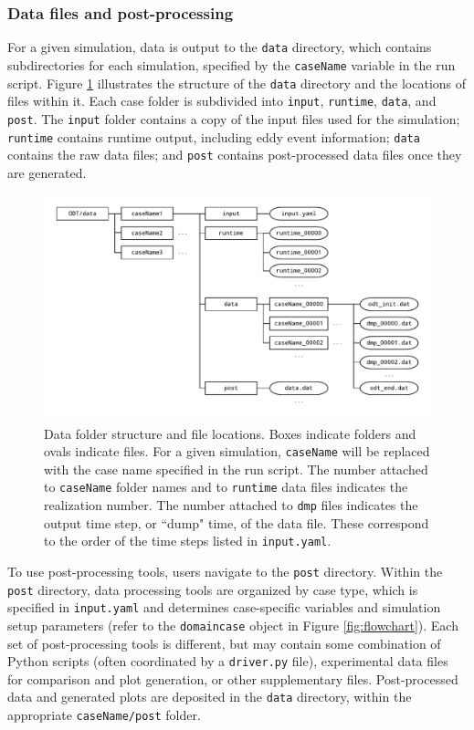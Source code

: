 \documentclass[preprint,12pt, a4paper]{elsarticle}
\begin{document}
\subsubsection{Data files and post-processing}

For a given simulation, data is output to the \texttt{data} directory, which contains subdirectories for each simulation, specified by the \texttt{caseName} variable in the run script. Figure \ref{fig:data_folder_structure} illustrates the structure of the \texttt{data} directory and the locations of files within it. Each case folder is subdivided into \texttt{input}, \texttt{runtime}, \texttt{data}, and \texttt{post}. The \texttt{input} folder contains a copy of the input files used for the simulation; \texttt{runtime} contains runtime output, including eddy event information; \texttt{data} contains the raw data files; and \texttt{post} contains post-processed data files once they are generated. 

\begin{figure}
	\centering
	\includegraphics[width=\textwidth]{../figures/data_folder_structure.pdf} 
	\caption{Data folder structure and file locations. Boxes indicate folders and ovals indicate files. For a given simulation, \texttt{caseName} will be replaced with the case name specified in the run script. The number attached to \texttt{caseName} folder names and to \texttt{runtime} data files indicates the realization number. The number attached to \texttt{dmp} files indicates the output time step, or ``dump" time, of the data file. These correspond to the order of the time steps listed in \texttt{input.yaml}.}
\label{fig:data_folder_structure}
\end{figure}

To use post-processing tools, users navigate to the \texttt{post} directory. Within the \texttt{post} directory, data processing tools are organized by case type, which is specified in \texttt{input.yaml} and determines case-specific variables and simulation setup parameters (refer to the \texttt{domaincase} object in Figure \ref{fig:flowchart}). Each set of post-processing tools is different, but may contain some combination of Python scripts (often coordinated by a \texttt{driver.py} file), experimental data files for comparison and plot generation, or other supplementary files. Post-processed data and generated plots are deposited in the \texttt{data} directory, within the appropriate \texttt{caseName/post} folder.  
\end{document}
